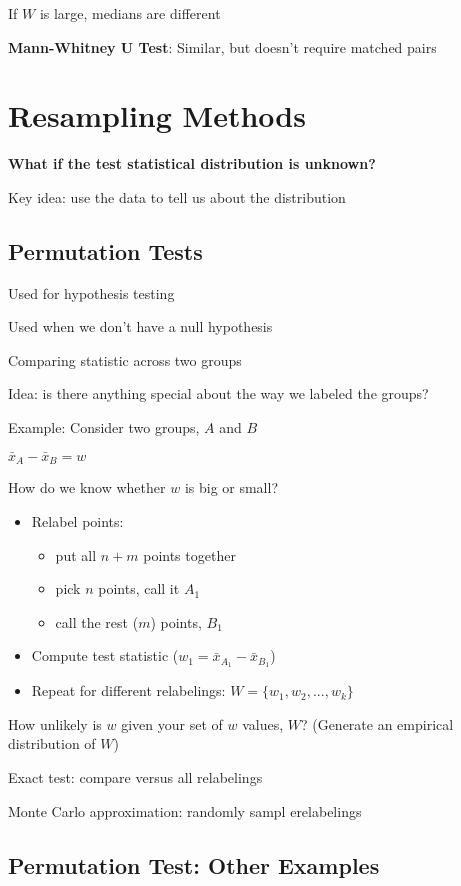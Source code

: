 \documentclass[twoside]{article}
\begin{document}
If $W$ is large, medians are different

\textbf{Mann-Whitney U Test}: Similar, but doesn't require matched pairs

\section{Resampling Methods}

\textbf{What if the test statistical distribution is unknown?}

Key idea: use the data to tell us about the distribution 

\subsection{Permutation Tests}

Used for hypothesis testing 

Used when we don't have a null hypothesis

Comparing statistic across two groups

Idea: is there anything special about the way we labeled the groups?

Example: Consider two groups, $A$ and $B$

$\bar{x}_A - \bar{x}_B = w$

How do we know whether $w$ is big or small?


\begin{itemize}
\item Relabel points: 
\begin{itemize}
\item put all $n + m$ points together
\item pick $n$ points, call it $A_1$
\item call the rest ($m$) points, $B_1$
\end{itemize}
\item Compute test statistic ($w_1 = \bar{x}_{A_1} - \bar{x}_{B_1}$)
\item Repeat for different relabelings: $W = \{ w_1, w_2, ..., w_k \}$
\end{itemize}

How unlikely is $w$ given your set of $w$ values, $W$? (Generate an empirical distribution of $W$)

Exact test: compare versus all relabelings

Monte Carlo approximation: randomly sampl erelabelings

\subsection{Permutation Test: Other Examples}
\end{document}
